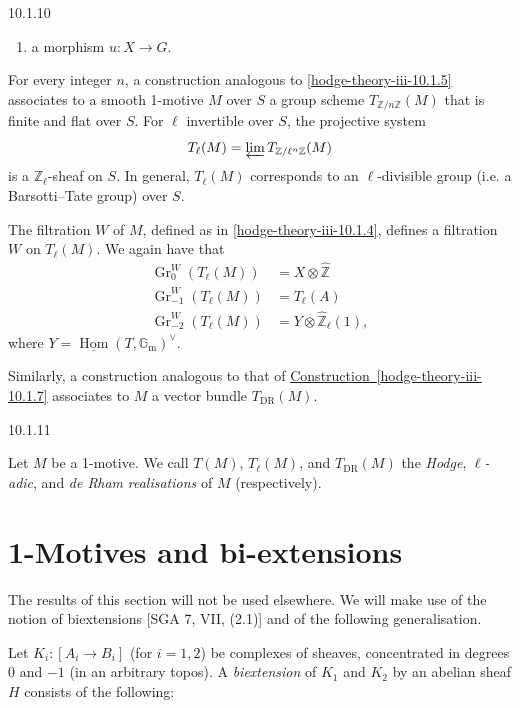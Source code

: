 \begin{variant}{10.1.10}
\begin{enumerate}
      
 \item[(c)]
        a morphism \(u\colon  X\to  G\).
      

    \end{enumerate}\par{}For every integer \(n\), a construction analogous to \cref{hodge-theory-iii-10.1.5} associates to a smooth 1-motive \(M\) over \(S\) a group scheme \(T_{\mathbb {Z}{/}n\mathbb {Z}}(M)\) that is finite and flat over \(S\).
    For \(\ell \) invertible over \(S\), the projective system
    \[       T_\ell (M)       = \varprojlim  T_{\mathbb {Z}{/}\ell ^n\mathbb {Z}}(M)     \]
    is a \(\mathbb {Z}_\ell \)-sheaf on \(S\).
    In general, \(T_\ell (M)\) corresponds to an \(\ell \)-divisible group (i.e. a Barsotti–Tate group) over \(S\).\par{}The filtration \(W\) of \(M\), defined as in \cref{hodge-theory-iii-10.1.4}, defines a filtration \(W\) on \(T_\ell (M)\).
    We again have that
    \[       \begin {aligned}         \operatorname {Gr}_0^W(T_\ell (M))         &= X\otimes \widehat {\mathbb {Z}}       \\\operatorname {Gr}_{-1}^W(T_\ell (M))         &= T_\ell (A)       \\\operatorname {Gr}_{-2}^W(T_\ell (M))         &= Y\otimes \widehat {\mathbb {Z}}_\ell (1),       \end {aligned}     \]
    where \(Y=\underline {\operatorname {Hom}}(T,\mathbb {G}_\mathrm {m})^\vee \).\par{}Similarly, a construction analogous to that of \hyperref[hodge-theory-iii-10.1.7]{Construction~\ref*{hodge-theory-iii-10.1.7}} associates to \(M\) a vector bundle \(T_\mathrm {DR}(M)\).\end{variant}\begin{terminology}{10.1.11}\label{hodge-theory-iii-10.1.11}\skipsinglepar\par{}Let \(M\) be a 1-motive.
    We call \(T(M)\), \(T_\ell (M)\), and \(T_\mathrm {DR}(M)\) the \emph{Hodge}, \emph{\(\ell \)-adic}, and \emph{de Rham} \emph{realisations} of \(M\) (respectively).\end{terminology}\section{1-Motives and bi-extensions}\label{hodge-theory-iii-10.2}\par{}The results of this section will not be used elsewhere.
  We will make use of the notion of biextensions [SGA 7, VII, (2.1)] and of the following generalisation.\label{hodge-theory-iii-10.2.1}\par{}Let \(K_i\colon [A_i\to  B_i]\) (for \(i=1,2\)) be complexes of sheaves, concentrated in degrees {0} and \(-1\) (in an arbitrary topos).
    A \emph{biextension} of \(K_1\) and \(K_2\) by an abelian sheaf \(H\) consists of the following:

